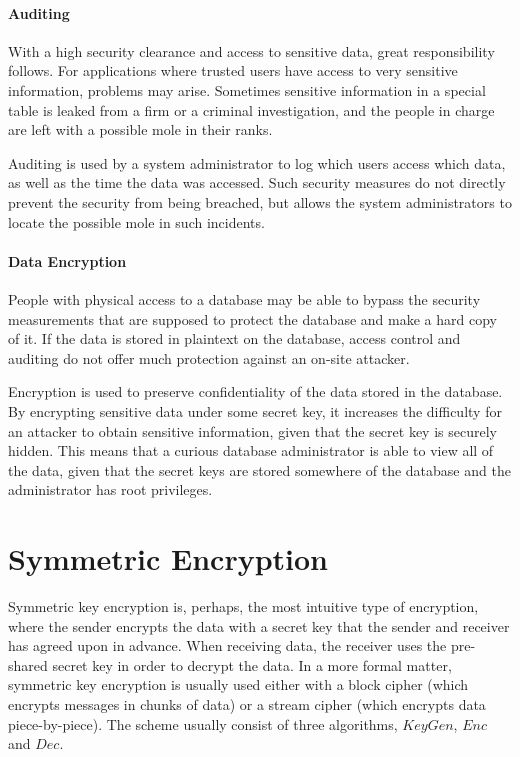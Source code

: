 \paragraph{Auditing}

With a high security clearance and access to sensitive data, great responsibility follows. For applications where trusted users have access to very sensitive information, problems may arise. Sometimes sensitive information in a special table is leaked from a firm or a criminal investigation, and the people in charge are left with a possible mole in their ranks.

Auditing is used by a system administrator to log which users access which data, as well as the time the data was accessed. Such security measures do not directly prevent the security from being breached, but allows the system administrators to locate the possible mole in such incidents. 


\paragraph{Data Encryption}

People with physical access to a database may be able to bypass the security measurements that are supposed to protect the database and make a hard copy of it. If the data is stored in plaintext on the database, access control and auditing do not offer much protection against an on-site attacker. 

Encryption is used to preserve confidentiality of the data stored in the database. By encrypting sensitive data under some secret key, it increases the difficulty for an attacker to obtain sensitive information, given that the secret key is securely hidden. This means that a curious database administrator is able to view all of the data, given that the secret keys are stored somewhere of the database and the administrator has root privileges. 

\section{Symmetric Encryption}

Symmetric key encryption is, perhaps, the most intuitive type of encryption, where the sender encrypts the data with a secret key that the sender and receiver has agreed upon in advance. When receiving data, the receiver uses the pre-shared secret key in order to decrypt the data. In a more formal matter, symmetric key encryption is usually used either with a block cipher (which encrypts messages in chunks of data) or a stream cipher (which encrypts data piece-by-piece). The scheme usually consist of three algorithms, $KeyGen$, $Enc$ and $Dec$.

